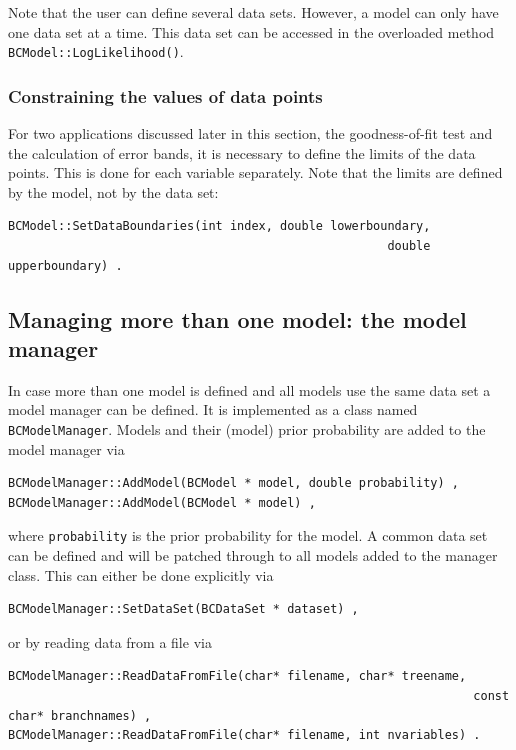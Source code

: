 \documentclass[11pt, a4paper]{article}
\begin{document}
\noindent 
Note that the user can define several data sets. However, a model can
only have one data set at a time. This data set can be accessed in the
overloaded method \verb|BCModel::LogLikelihood()|.


\subsubsection{Constraining the values of data points}

For two applications discussed later in this section, the
goodness-of-fit test and the calculation of error bands, it is
necessary to define the limits of the data points. This is done for
each variable separately. Note that the limits are defined by the
model, not by the data set:
%
\begin{verbatim}
BCModel::SetDataBoundaries(int index, double lowerboundary, 
													 double upperboundary) . 
\end{verbatim}


\subsection{Managing more than one model: the model manager} 
\label{subsection:modelmanager}

In case more than one model is defined and all models use the same
data set a model manager can be defined. It is implemented as a class
named \verb|BCModelManager|. Models and their (model) prior
probability are added to the model manager via
% 
\begin{verbatim}
BCModelManager::AddModel(BCModel * model, double probability) , 
BCModelManager::AddModel(BCModel * model) , 
\end{verbatim} 

\noindent 
where \verb|probability| is the prior probability for the model. A
common data set can be defined and will be patched through to all
models added to the manager class. This can either be done explicitly
via
%
\begin{verbatim}
BCModelManager::SetDataSet(BCDataSet * dataset) , 
\end{verbatim} 

\noindent 
or by reading data from a file via 
%
\begin{verbatim}
BCModelManager::ReadDataFromFile(char* filename, char* treename, 
																 const char* branchnames) , 
BCModelManager::ReadDataFromFile(char* filename, int nvariables) . 
\end{verbatim} 
\end{document}
